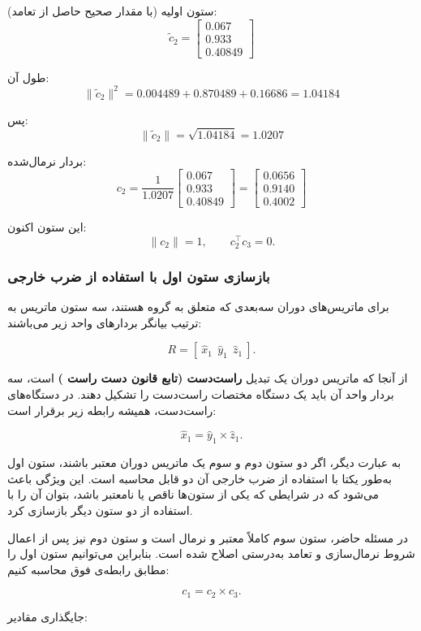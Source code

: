 \documentclass{article}
\begin{document}
ستون اولیه (با مقدار صحیح حاصل از تعامد):
\[
\tilde{c}_2 = \begin{bmatrix} 0.067 \\ 0.933 \\ 0.40849 \end{bmatrix}
\]

طول آن:
\[
\|\tilde{c}_2\|^2 = 0.004489 + 0.870489 + 0.16686 = 1.04184
\]

پس:
\[
\|\tilde{c}_2\| = \sqrt{1.04184} = 1.0207
\]

بردار نرمال‌شده:
\[
c_2 = \frac{1}{1.0207}
\begin{bmatrix}
	0.067 \\ 0.933 \\ 0.40849
\end{bmatrix}
=
\begin{bmatrix}
	0.0656 \\ 0.9140 \\ 0.4002
\end{bmatrix}
\]

این ستون اکنون:
\[
\|c_2\|=1, \qquad c_2^\top c_3 = 0.
\]

\subsubsection{بازسازی ستون اول با استفاده از ضرب خارجی}

برای ماتریس‌های دوران سه‌بعدی که متعلق به گروه  هستند، سه ستون ماتریس به ترتیب بیانگر بردارهای واحد زیر می‌باشند:

\[
R = [\ \hat{x}_1 \ \ \hat{y}_1 \ \ \hat{z}_1\ ].
\]

از آنجا که ماتریس دوران یک تبدیل \textbf{راست‌دست (تابع قانون دست راست )} است، سه بردار واحد آن باید یک دستگاه مختصات راست‌دست را تشکیل دهند.  
در دستگاه‌های راست‌دست، همیشه رابطه زیر برقرار است:

\[
\hat{x}_1 = \hat{y}_1 \times \hat{z}_1.
\]

به عبارت دیگر، اگر دو ستون دوم و سوم یک ماتریس دوران معتبر باشند، ستون اول به‌طور یکتا با استفاده از ضرب خارجی آن دو قابل محاسبه است.  
این ویژگی باعث می‌شود که در شرایطی که یکی از ستون‌ها ناقص یا نامعتبر باشد، بتوان آن را با استفاده از دو ستون دیگر بازسازی کرد.

در مسئله حاضر، ستون سوم کاملاً معتبر و نرمال است و ستون دوم نیز پس از اعمال شروط نرمال‌سازی و تعامد به‌درستی اصلاح شده است.  
بنابراین می‌توانیم ستون اول را مطابق رابطه‌ی فوق محاسبه کنیم:

\[
c_1 = c_2 \times c_3.
\]

جایگذاری مقادیر:
\end{document}
